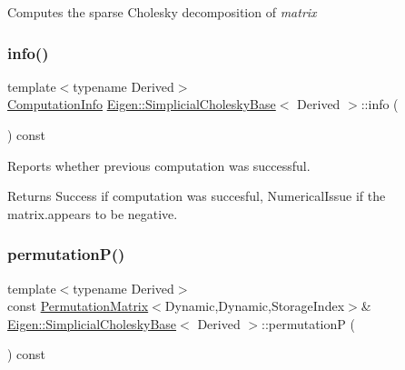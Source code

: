 Computes the sparse Cholesky decomposition of {\itshape matrix} \mbox{\label{class_eigen_1_1_simplicial_cholesky_base_a3ac877f73aaaff670e6ae7554eb02fc8}} 
\subsubsection{\texorpdfstring{info()}{info()}}
{\footnotesize\ttfamily template$<$typename Derived$>$ \\
\mbox{\hyperlink{group__enums_ga85fad7b87587764e5cf6b513a9e0ee5e}{Computation\+Info}} \mbox{\hyperlink{class_eigen_1_1_simplicial_cholesky_base}{Eigen\+::\+Simplicial\+Cholesky\+Base}}$<$ Derived $>$\+::info (\begin{DoxyParamCaption}{ }\end{DoxyParamCaption}) const\hspace{0.3cm}{\ttfamily [inline]}}



Reports whether previous computation was successful. 

\begin{DoxyReturn}{Returns}
{\ttfamily Success} if computation was succesful, {\ttfamily Numerical\+Issue} if the matrix.\+appears to be negative. 
\end{DoxyReturn}
\mbox{\label{class_eigen_1_1_simplicial_cholesky_base_aff1480e595a21726beaec9a586a94d5a}} 
\subsubsection{\texorpdfstring{permutationP()}{permutationP()}}
{\footnotesize\ttfamily template$<$typename Derived$>$ \\
const \mbox{\hyperlink{class_eigen_1_1_permutation_matrix}{Permutation\+Matrix}}$<$Dynamic,Dynamic,Storage\+Index$>$\& \mbox{\hyperlink{class_eigen_1_1_simplicial_cholesky_base}{Eigen\+::\+Simplicial\+Cholesky\+Base}}$<$ Derived $>$\+::permutationP (\begin{DoxyParamCaption}{ }\end{DoxyParamCaption}) const\hspace{0.3cm}{\ttfamily [inline]}}

